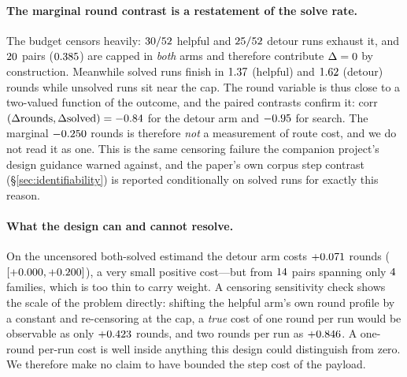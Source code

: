 \paragraph{The marginal round contrast is a restatement of the solve rate.} The budget
censors heavily: $30{}/52{}$ helpful and
$25{}/52{}$ detour runs exhaust it, and
$20{}$ pairs ($0.385{}$) are capped in \emph{both} arms
and therefore contribute $\Delta=0$ by construction. Meanwhile solved runs finish in
$1.37{}$ (helpful) and $1.62{}$ (detour) rounds
while unsolved runs sit near the cap. The round variable is thus close to a two-valued
function of the outcome, and the paired contrasts confirm it:
corr$(\Delta\text{rounds},\Delta\text{solved})=-0.84{}$ for the detour arm
and $-0.95{}$ for search. The marginal $-0.250{}$ rounds is
therefore \emph{not} a measurement of route cost, and we do not read it as one. This is
the same censoring failure the companion project's design guidance warned against, and
the paper's own corpus step contrast (\S\ref{sec:identifiability}) is reported
conditionally on solved runs for exactly this reason.

\paragraph{What the design can and cannot resolve.} On the uncensored both-solved
estimand the detour arm costs $+0.071{}$ rounds
($[+0.000{},+0.200{}]$), a very small positive
cost---but from $14{}$ pairs spanning only $4{}$
families, which is too thin to carry weight. A censoring sensitivity check shows the
scale of the problem directly: shifting the helpful arm's own round profile by a constant
and re-censoring at the cap, a \emph{true} cost of one round per run would be observable
as only $+0.423{}$ rounds, and two rounds per run as $+0.846{}$. A one-round
per-run cost is well inside anything this design could distinguish from zero. We
therefore make no claim to have bounded the step cost of the payload.

